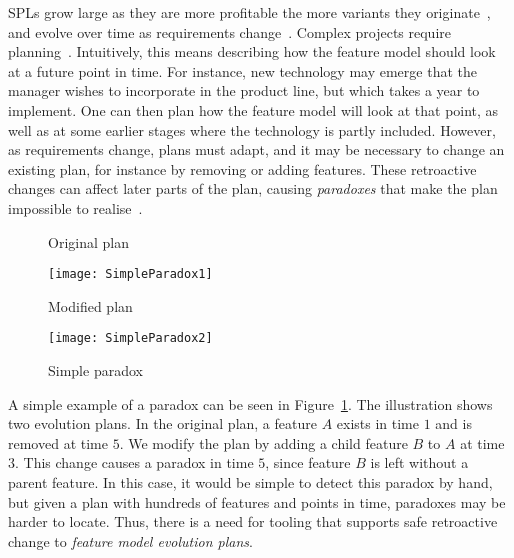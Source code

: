 SPLs grow large as they are more profitable the more variants they originate~\cite{book:introduction-to-spl}, %
and evolve over time as requirements change~\cite{art:context-aware-reconfiguration-in-evolving-software-product-lines, art:darwinspl-an-integrated-tool-suite-for-modeling-evolving-context-aware-software-product-lines}. Complex projects require planning~\cite{art:evofm-feature-driven-planning-of-product-line-evolution}. Intuitively, this means describing how the feature model should look at a future point in time. For instance, new technology may emerge that the manager wishes to incorporate in the product line, but which takes a year to implement. One can then plan how the feature model will look at that point, as well as at some earlier stages where the technology is partly included. However, as requirements change, plans must adapt, and it may be necessary to change an existing plan, for instance by removing or adding features. These retroactive changes can affect later parts of the plan, causing \emph{paradoxes} that make the plan impossible to realise~\cite{art:anomaly-detection-and-explanation-in-context-aware-software-product-lines}. 

\begin{figure}
   \begin{centering}
      \begin{minipage}[t]{0.42\textwidth}
         \vspace{0pt}
         \small
         \begin{center}
            Original plan
         \end{center}
         \texttt{[image: SimpleParadox1]}
      \end{minipage}\hfill
      \begin{minipage}[t]{0.56\textwidth}
         \vspace{0pt}
         \small
          \begin{center}
             Modified plan
          \end{center} 
         \texttt{[image: SimpleParadox2]}
      \end{minipage}
   \end{centering}
   \caption{Simple paradox}
   \label{ex:simple-paradox}
\end{figure}

A simple example of a paradox can be seen in Figure~\ref{ex:simple-paradox}. The illustration shows two evolution plans. In the original plan, a feature $A$ exists in time $1$ and is removed at time $5$. We modify the plan by adding a child feature $B$ to $A$ at time $3$. This change causes a paradox in time $5$, since feature $B$ is left without a parent feature. In this case, it would be simple to detect this paradox by hand, but given a plan with hundreds of features and points in time, paradoxes may be harder to locate.  Thus, there is a need for tooling that supports safe retroactive change to \emph{feature model evolution plans}. 

